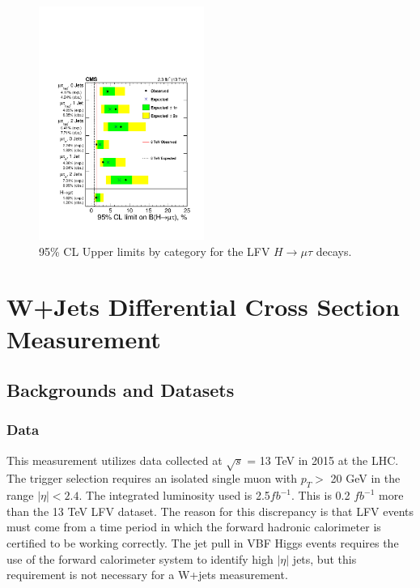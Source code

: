\documentclass[oneside, letterpaper, oldfontcommands]{memoir}
\begin{document}
\begin{figure}[hbtp]\centering
\includegraphics[width=0.48\textwidth]{13TeVLimits.pdf}
 \caption{95\% CL Upper limits by category for the LFV $H \rightarrow \mu \tau$  decays.}
 \label{fig:limits_summary13TeV}\end{figure}



\chapter{W+Jets Differential Cross Section Measurement}\label{wjets}
\section{Backgrounds and Datasets}
\subsection{Data}
\qquad This measurement utilizes data collected at $\sqrt{s}$ = 13 TeV in 2015 at the LHC. The trigger selection requires an isolated single muon with $p_{T} >$ 20 GeV in the range $|\eta| < 2.4$. The integrated luminosity used is 2.5$fb^{-1}$. This is 0.2 $fb^{-1}$ more than the 13 TeV LFV dataset. The reason for this discrepancy is that LFV events must come from a time period in which the forward hadronic calorimeter is certified to be working correctly. The jet pull in VBF Higgs events requires the use of the forward calorimeter system to identify high $|\eta|$ jets, but this requirement is not necessary for a W+jets measurement.
\end{document}
